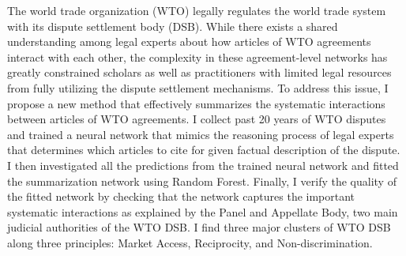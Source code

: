The world trade organization (WTO) legally regulates the world trade system with its dispute settlement body (DSB).
While there exists a shared understanding among legal experts about how articles of WTO agreements interact with each other,
the complexity in these agreement-level networks has greatly constrained scholars as well as practitioners with limited legal resources from fully utilizing the dispute settlement mechanisms. 
To address this issue, I propose a new method that effectively summarizes the systematic interactions between articles of WTO agreements.
I collect past 20 years of WTO disputes and trained a neural network that mimics the reasoning process of legal experts that determines which articles to cite for given factual description of the dispute.
I then investigated all the predictions from the trained neural network and fitted the summarization network using Random Forest.
Finally, I verify the quality of the fitted network by checking that the network captures the important systematic interactions as explained by the Panel and Appellate Body, two main judicial authorities of the WTO DSB.  %
I find three major clusters of WTO DSB along three principles: Market Access, Reciprocity, and Non-discrimination.

